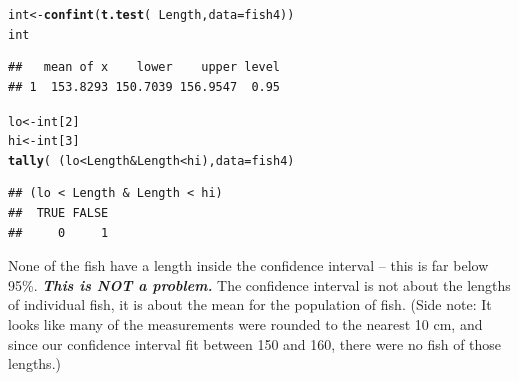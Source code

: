 \documentclass[twoside]{book}\usepackage[]{graphicx}\usepackage[]{xcolor}
\makeatletter
\newcommand{\hlnum}[1]{\textcolor[rgb]{0.686,0.059,0.569}{#1}}%
\newcommand{\hlopt}[1]{\textcolor[rgb]{0,0,0}{#1}}%
\newcommand{\hlstd}[1]{\textcolor[rgb]{0.345,0.345,0.345}{#1}}%
\newcommand{\hlkwb}[1]{\textcolor[rgb]{0.69,0.353,0.396}{#1}}%
\newcommand{\hlkwc}[1]{\textcolor[rgb]{0.333,0.667,0.333}{#1}}%
\newcommand{\hlkwd}[1]{\textcolor[rgb]{0.737,0.353,0.396}{\textbf{#1}}}%
\newenvironment{kframe}{%
 \def\at@end@of@kframe{}%
 \ifinner\ifhmode%
  \def\at@end@of@kframe{\end{minipage}}%
  \begin{minipage}{\columnwidth}%
 \fi\fi%
 \def\FrameCommand##1{\hskip\@totalleftmargin \hskip-\fboxsep
 \colorbox{shadecolor}{##1}\hskip-\fboxsep
     \hskip-\linewidth \hskip-\@totalleftmargin \hskip\columnwidth}%
 \MakeFramed {\advance\hsize-\width
   \@totalleftmargin\z@ \linewidth\hsize
   \@setminipage}}%
 {\par\unskip\endMakeFramed%
 \at@end@of@kframe}
\newenvironment{knitrout}{}{} %
\makeatother
\begin{document}
\begin{solution}
\begin{enumerate}
\begin{knitrout}
{}



\end{knitrout}
\begin{knitrout}
\color{fgcolor}\begin{kframe}
\begin{alltt}
\hlstd{int} \hlkwb{<-} \hlkwd{confint}\hlstd{(}\hlkwd{t.test}\hlstd{(} \hlopt{~}\hlstd{Length,} \hlkwc{data}\hlstd{=fish4))}
\hlstd{int}
\end{alltt}
\begin{verbatim}
##   mean of x    lower    upper level
## 1  153.8293 150.7039 156.9547  0.95
\end{verbatim}
\begin{alltt}
\hlstd{lo} \hlkwb{<-} \hlstd{int[}\hlnum{2}\hlstd{]}
\hlstd{hi} \hlkwb{<-} \hlstd{int[}\hlnum{3}\hlstd{]}
\hlkwd{tally} \hlstd{(} \hlopt{~} \hlstd{( lo} \hlopt{<} \hlstd{Length} \hlopt{&} \hlstd{Length} \hlopt{<} \hlstd{hi ),} \hlkwc{data}\hlstd{=fish4 )}
\end{alltt}
\begin{verbatim}
## (lo < Length & Length < hi)
##  TRUE FALSE 
##     0     1
\end{verbatim}
\end{kframe}
\end{knitrout}
None of the fish have a length inside the confidence interval -- this is far below 95\%.  
\textbf{\emph{This is NOT a problem.}}
The confidence interval is not about the lengths of individual fish, it is about 
the mean for the population of fish.  (Side note: It looks like many of the measurements
were rounded to the nearest 10 cm, and since our confidence interval fit between 150 and 160,
there were no fish of those lengths.)


\end{enumerate}
\end{solution}
\end{document}
